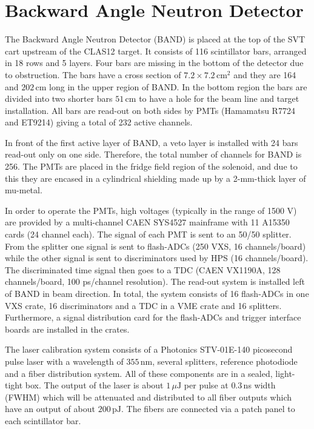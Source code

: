 \section{Backward Angle Neutron Detector}
The Backward Angle Neutron Detector (BAND) is placed at the top of the SVT cart upstream of the CLAS12 target.  It consists of 116 scintillator bars, arranged in 18 rows and 5 layers.  Four bars are missing in the bottom of the detector due to obstruction.  The bars have a cross section of $7.2 \times 7.2\,\mathrm{cm}^{2}$ and they are 164 and $202\,\mathrm{cm}$ long in the upper region of BAND.  In the bottom region the bars are divided into two shorter bars $51\,\mathrm{cm}$ to have a hole for the beam line and target installation.  All bars are read-out on both sides by PMTs (Hamamatsu R7724 and ET9214) giving a total of 232 active channels. 

In front of the first active layer of BAND,  a veto layer is installed with 24 bars read-out only on one side.  Therefore,  the total number of channels for BAND is 256.
The PMTs are placed in the fridge field region of the solenoid,  and due to this they are encased in a cylindrical shielding made up by a 2-mm-thick layer of mu-metal.

In order to operate the PMTs,  high voltages (typically in the range of 1500 V) are provided by a multi-channel CAEN SYS4527 mainframe with 11 A15350 cards (24 channel each).
The signal of each PMT is sent to an 50/50 splitter.
From the splitter one signal is sent to flash-ADCs (250 VXS, 16 channels/board) while the other signal is sent to discriminators used by HPS (16 channels/board).
The discriminated time signal then goes to a TDC (CAEN VX1190A, 128 channels/board, 100 ps/channel resolution).  The read-out system is installed left of BAND in beam direction. 
In total,  the system consists of 16 flash-ADCs in one VXS crate,  16 discriminators and a TDC in a VME crate and 16 splitters.  Furthermore,  a signal distribution card for the flash-ADCs and trigger interface boards are installed in the crates.

The laser calibration system consists of a Photonics STV-01E-140 picosecond pulse laser with a wavelength of $355\,\mathrm{nm}$,  several splitters,  reference photodiode and a fiber distribution system.  All of these components are in a sealed,  light-tight box.  The output of the laser is about $1\,\mu\mathrm{J}$ per pulse at $0.3\,$ns width (FWHM) which will be attenuated and distributed to all fiber outputs which have an output of about $200\,\mathrm{pJ}$.  The fibers are connected via a patch panel to each scintillator bar.

